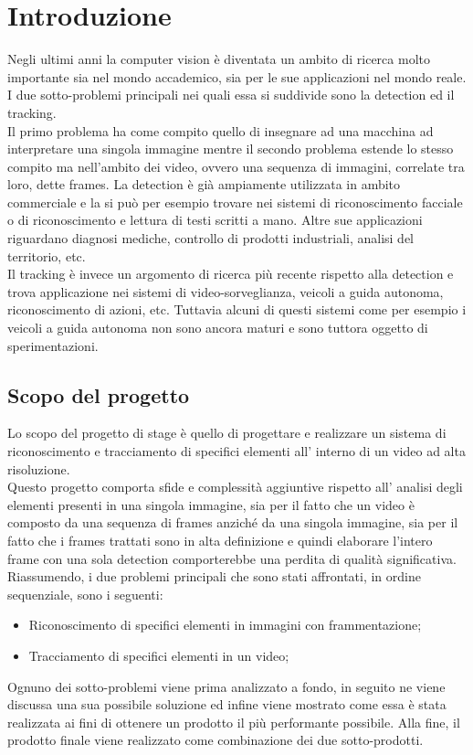 \section{Introduzione}
Negli ultimi anni la computer vision è diventata un ambito di ricerca molto importante sia nel mondo accademico, sia per le sue applicazioni nel mondo reale. I due sotto-problemi principali nei quali essa si suddivide sono la detection ed il tracking.\\
Il primo problema ha come compito quello di insegnare ad una macchina ad interpretare una singola immagine mentre il secondo problema estende lo stesso compito ma nell'ambito dei video, ovvero una sequenza di immagini, correlate tra loro, dette frames. La detection è già ampiamente utilizzata in ambito commerciale e la si può per esempio trovare nei sistemi di riconoscimento facciale o di riconoscimento e lettura di testi scritti a mano. Altre sue applicazioni riguardano diagnosi mediche, controllo di prodotti industriali, analisi del territorio, etc.\\ 
Il tracking è invece un argomento di ricerca più recente rispetto alla detection e trova applicazione nei sistemi di video-sorveglianza, veicoli a guida autonoma, riconoscimento di azioni, etc. Tuttavia alcuni di questi sistemi come per esempio i veicoli a guida autonoma non sono ancora maturi e sono tuttora oggetto di sperimentazioni.
\subsection{Scopo del progetto}
Lo scopo del progetto di stage è quello di progettare e realizzare un sistema di riconoscimento e tracciamento di specifici elementi all' interno di un video ad alta risoluzione.\\
Questo progetto comporta sfide e complessità aggiuntive rispetto all' analisi degli elementi presenti in una singola immagine, sia per il fatto che un video è composto da una sequenza di frames anziché da una singola immagine, sia per il fatto che i frames trattati sono in alta definizione e quindi elaborare l'intero frame con una sola detection comporterebbe una perdita di qualità significativa.\\
Riassumendo, i due problemi principali che sono stati affrontati, in ordine sequenziale, sono i seguenti:
\begin{itemize}
\item Riconoscimento di specifici elementi in immagini con frammentazione;
\item Tracciamento di specifici elementi in un video;
\end{itemize}
Ognuno dei sotto-problemi viene prima analizzato a fondo, in seguito ne viene discussa una sua possibile soluzione ed infine viene mostrato come essa è stata realizzata ai fini di ottenere un prodotto il più performante possibile.
Alla fine, il prodotto finale viene realizzato come combinazione dei due sotto-prodotti.

